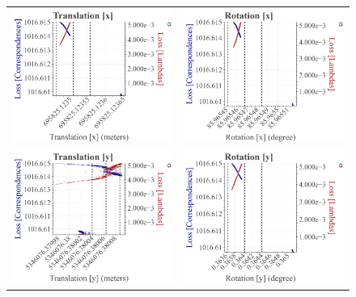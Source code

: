 \begin{figure}[t]
  \centering
  \begin{tabular}{cc}
    \includegraphics[width=0.45 \linewidth]{diagrams/calibration/s40_n_far_small/parameters_all.csv/Translation[x]_vs_Loss[Correspondences]_vs_Loss[Lambdas]_cluster_All.png} &
    \includegraphics[width=0.45 \linewidth]{diagrams/calibration/s40_n_far_small/parameters_all.csv/Rotation[x]_vs_Loss[Correspondences]_vs_Loss[Lambdas]_cluster_All.png} \\
    
    \includegraphics[width=0.45 \linewidth]{diagrams/calibration/s40_n_far_small/parameters_all.csv/Translation[y]_vs_Loss[Correspondences]_vs_Loss[Lambdas]_cluster_All.png} &
    \includegraphics[width=0.45 \linewidth]{diagrams/calibration/s40_n_far_small/parameters_all.csv/Rotation[y]_vs_Loss[Correspondences]_vs_Loss[Lambdas]_cluster_All.png} \\
    

\end{tabular}
\end{figure}
